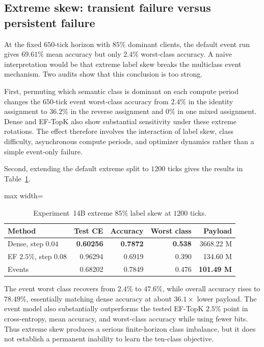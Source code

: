 \subsection{Extreme skew: transient failure versus persistent failure}

At the fixed $650$-tick horizon with $85\%$ dominant clients, the default event run gives $69.61\%$ mean accuracy but only $2.4\%$ worst-class accuracy. A naive interpretation would be that extreme label skew breaks the multiclass event mechanism. Two audits show that this conclusion is too strong.

First, permuting which semantic class is dominant on each compute period changes the $650$-tick event worst-class accuracy from $2.4\%$ in the identity assignment to $36.2\%$ in the reverse assignment and $0\%$ in one mixed assignment. Dense and EF-TopK also show substantial sensitivity under these extreme rotations. The effect therefore involves the interaction of label skew, class difficulty, asynchronous compute periods, and optimizer dynamics rather than a simple event-only failure.

Second, extending the default extreme split to $1200$ ticks gives the results in Table~\ref{tab:exp14b-extreme-long}.

\begin{table}[t]
\centering
\caption{Experiment~14B extreme $85\%$ label skew at $1200$ ticks.}
\label{tab:exp14b-extreme-long}
\begin{adjustbox}{max width=\textwidth}
\begin{tabular}{lrrrr}
\toprule
Method & Test CE & Accuracy & Worst class & Payload\\
\midrule
Dense, step $0.04$ & \textbf{0.60256} & \textbf{0.7872} & \textbf{0.538} & 3668.22 M\\
EF $2.5\%$, step $0.08$ & 0.96294 & 0.6919 & 0.390 & 134.60 M\\
Events & 0.68202 & 0.7849 & 0.476 & \textbf{101.49 M}\\
\bottomrule
\end{tabular}
\end{adjustbox}
\end{table}

The event worst class recovers from $2.4\%$ to $47.6\%$, while overall accuracy rises to $78.49\%$, essentially matching dense accuracy at about $36.1\times$ lower payload. The event model also substantially outperforms the tested EF-TopK $2.5\%$ point in cross-entropy, mean accuracy, and worst-class accuracy while using fewer bits. Thus extreme skew produces a serious finite-horizon class imbalance, but it does not establish a permanent inability to learn the ten-class objective.

